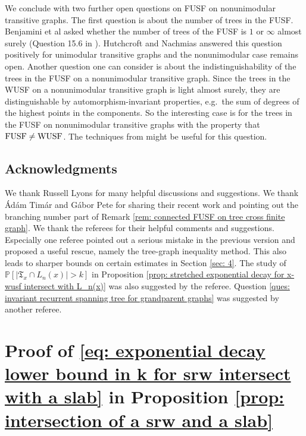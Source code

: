 \documentclass[12pt]{article}
\numberwithin{equation}{section}
\newcommand{\1}{\mathbf{1}}
\begin{document}
We conclude with two further open questions on FUSF on nonunimodular transitive graphs. The first question is about the number of trees in the FUSF. Benjamini et al asked whether the number of trees of the FUSF is $1$ or $\infty$ almost surely (Question 15.6 in \cite{BLPS2001}). Hutchcroft and Nachmias \cite{TomAsaf2017} answered this question positively for unimodular transitive graphs and the nonunimodular case remains open.  Another question one can consider is about the indistinguishability of the trees in the FUSF on a nonunimodular transitive graph. Since the trees in the WUSF on a nonunimodular transitive graph is light almost surely, they are distinguishable by automorphism-invariant properties, e.g.\ the sum of degrees of the highest points in the components. So the  interesting case is for the trees in the FUSF on nonunimodular transitive graphs with the property that $\textnormal{FUSF}\neq \textnormal{WUSF}$. The techniques from \cite{TomAsaf2017, Timar2018indis,Tang2018} might be useful for this question. 



\subsection*{Acknowledgments}
We thank Russell Lyons for many helpful discussions and suggestions. We thank \'{A}d\'{a}m Tim\'{a}r and G\'{a}bor Pete for sharing their recent work \cite{PeteTimar2020} and  pointing out the branching number part of Remark \ref{rem: connected FUSF on tree cross finite graph}.  We thank the referees for their helpful comments and suggestions. Especially one referee pointed out a serious mistake in the previous version and proposed a useful rescue, namely the tree-graph inequality method.  This also leads to sharper bounds on certain estimates in Section \ref{sec: 4}. The study of $\mathbb{P}[|\mathfrak{T}_x\cap L_n(x)|>k]$ in Proposition \ref{prop: stretched exponential decay for x-wusf intersect with L_n(x)} was also suggested by the referee. Question \ref{ques: invariant recurrent spanning tree for grandparent graphs} was suggested by another referee. 

\appendix
\section{Proof of \eqref{eq: exponential decay lower bound in k for srw intersect with a slab} in Proposition \ref{prop: intersection of a srw and a slab}}\label{sec: appendix A}
\end{document}
